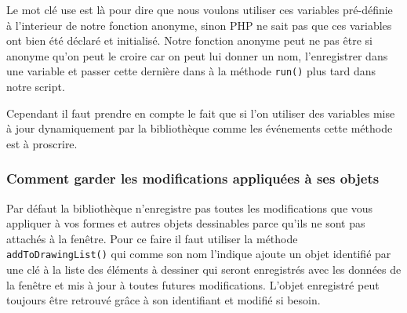 \documentclass[11pt,a4paper,krantz2,11pt,oneside]{krantz}
\newenvironment{Shaded}{\begin{snugshade}}{\end{snugshade}}
\newcommand{\CommentTok}[1]{\textcolor[rgb]{0.37,0.37,0.37}{\textit{#1}}}
\newcommand{\KeywordTok}[1]{\textcolor[rgb]{0.27,0.27,0.27}{\textbf{#1}}}
\newcommand{\NormalTok}[1]{#1}
\newcommand{\OtherTok}[1]{\textcolor[rgb]{0.37,0.37,0.37}{#1}}
\newcommand{\StringTok}[1]{\textcolor[rgb]{0.5,0.5,0.5}{#1}}
\begin{document}
Le mot clé use est là pour dire que nous voulons utiliser ces variables pré-définie à l'interieur de notre fonction anonyme, sinon PHP ne sait pas que ces variables ont bien été déclaré et initialisé. Notre fonction anonyme peut ne pas être si anonyme qu'on peut le croire car on peut lui donner un nom, l'enregistrer dans une variable et passer cette dernière dans à la méthode \texttt{run()} plus tard dans notre script.

\begin{Shaded}
\end{Shaded}

Cependant il faut prendre en compte le fait que si l'on utiliser des variables mise à jour dynamiquement par la bibliothèque comme les événements cette méthode est à proscrire.

\hypertarget{comment-garder-les-modifications-appliquuxe9es-uxe0-ses-objets}{%
\subsubsection{Comment garder les modifications appliquées à ses objets}\label{comment-garder-les-modifications-appliquuxe9es-uxe0-ses-objets}}

Par défaut la bibliothèque n'enregistre pas toutes les modifications que vous appliquer à vos formes et autres objets dessinables parce qu'ils ne sont pas attachés à la fenêtre. Pour ce faire il faut utiliser la méthode \texttt{addToDrawingList()} qui comme son nom l'indique ajoute un objet identifié par une clé à la liste des éléments à dessiner qui seront enregistrés avec les données de la fenêtre et mis à jour à toutes futures modifications. L'objet enregistré peut toujours être retrouvé grâce à son identifiant et modifié si besoin.
\end{document}
